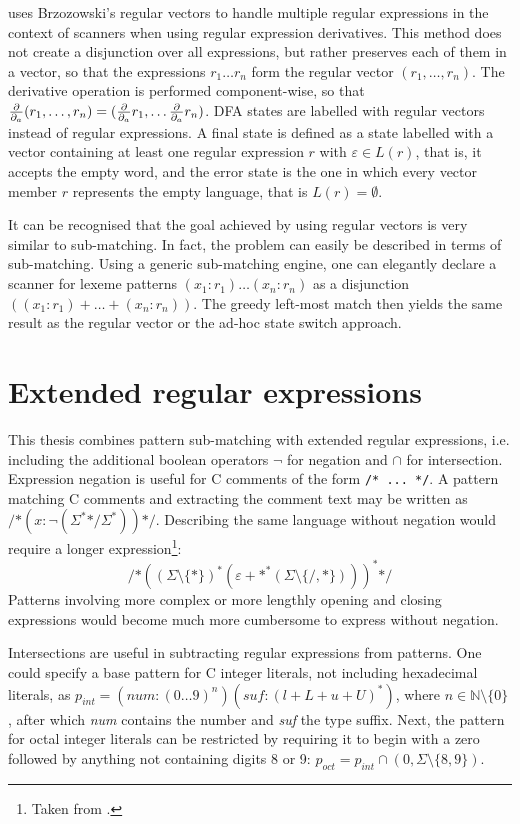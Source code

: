 \cite{re-deriv} uses Brzozowski's regular vectors to handle multiple regular
expressions in the context of scanners when using regular expression
derivatives. This method does not create a disjunction over all expressions, but
rather preserves each of them in a vector, so that the expressions $r_1 \dots
r_n$ form the regular vector $(r_1, \dots, r_n)$. The derivative operation is
performed component-wise, so that $\frac{\partial}{\partial_{a}}(r_1, \dots, r_n) = (\frac{\partial}{\partial_{a}} r_1, \dots \frac{\partial}{\partial_{a}}
r_n)$. DFA states are labelled with regular vectors instead of regular
expressions. A final state is defined as a state labelled with a vector
containing at least one regular expression $r$ with $\varepsilon \in L(r)$, that
is, it accepts the empty word, and the error state is the one in which every
vector member $r$ represents the empty language, that is $L(r) = \emptyset$.

It can be recognised that the goal achieved by using regular vectors is very
similar to sub-matching. In fact, the problem can easily be described in terms
of sub-matching. Using a generic sub-matching engine, one can elegantly declare
a scanner for lexeme patterns $(x_1:r_1) \dots (x_n:r_n)$ as a disjunction
$((x_1:r_1) + \dots + (x_n:r_n))$. The greedy left-most match then yields the
same result as the regular vector or the ad-hoc state switch approach.


\section{Extended regular expressions}

This thesis combines pattern sub-matching with extended regular expressions,
i.e. including the additional boolean operators $\neg$ for negation and $\cap$
for intersection. Expression negation is useful for C comments of the form
\verb!/* ... */!. A pattern matching C comments and extracting the comment text
may be written as $\texttt{/*}(x:\neg(\Sigma^*\texttt{*/}\Sigma^*))\texttt{*/}$.
Describing the same language without negation would require a longer
expression\footnote{Taken from \cite{re-deriv}.}:
\[
  \texttt{/*}
  (
    (\Sigma \setminus \{*\})^*
    (\varepsilon + \texttt{*}^* (\Sigma \setminus \{\texttt{/}, \texttt{*}\}))
  )^*
  \texttt{*/}
\]
Patterns involving more complex or more lengthly opening and closing expressions
would become much more cumbersome to express without negation.

Intersections are useful in subtracting regular expressions from patterns. One
could specify a base pattern for C integer literals, not including hexadecimal
literals, as $p_{\mathit{int}} = (\mathit{num}:(0 \dots 9)^n)
(\mathit{suf}:(l+L+u+U)^*)$, where $n \in \mathbb{N} \setminus \{0\}$, after
which \textit{num} contains the number and \textit{suf} the type suffix. Next,
the pattern for octal integer literals can be restricted by requiring it to
begin with a zero followed by anything not containing digits 8 or 9:
$p_{\mathit{oct}} = p_{\mathit{int}} \cap (0, \Sigma \setminus \{8, 9\})$.

